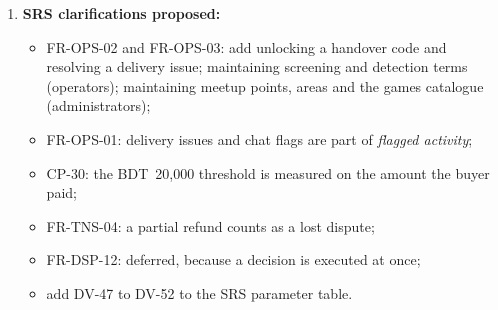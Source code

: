 \documentclass[11pt,a4paper]{article}
\begin{document}
\begin{enumerate}[label=\textbf{I-\arabic*}, leftmargin=*, nosep]
  \item \textbf{SRS clarifications proposed:}
  \begin{itemize}[nosep]
    \item FR-OPS-02 and FR-OPS-03: add unlocking a handover code and resolving a delivery issue; maintaining screening and detection terms (operators); maintaining meetup points, areas and the games catalogue (administrators);
    \item FR-OPS-01: delivery issues and chat flags are part of \emph{flagged activity};
    \item CP-30: the BDT~20{,}000 threshold is measured on the amount the buyer paid;
    \item FR-TNS-04: a partial refund counts as a lost dispute;
    \item FR-DSP-12: deferred, because a decision is executed at once;
    \item add DV-47 to DV-52 to the SRS parameter table.
  \end{itemize}
\end{enumerate}

\appendix
\end{document}
